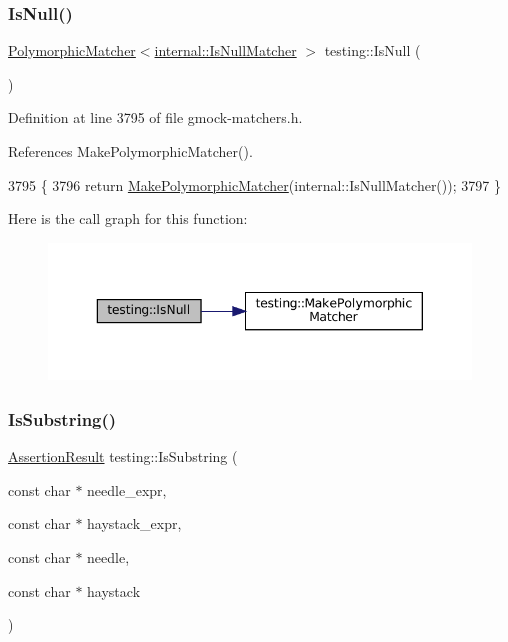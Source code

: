 \subsubsection{\texorpdfstring{Is\+Null()}{IsNull()}}
{\footnotesize\ttfamily \hyperlink{classtesting_1_1PolymorphicMatcher}{Polymorphic\+Matcher}$<$\hyperlink{classtesting_1_1internal_1_1IsNullMatcher}{internal\+::\+Is\+Null\+Matcher} $>$ testing\+::\+Is\+Null (\begin{DoxyParamCaption}{ }\end{DoxyParamCaption})\hspace{0.3cm}{\ttfamily [inline]}}



Definition at line 3795 of file gmock-\/matchers.\+h.



References Make\+Polymorphic\+Matcher().


\begin{DoxyCode}
3795                                                            \{
3796   \textcolor{keywordflow}{return} \hyperlink{namespacetesting_a667ca94f190ec2e17ee2fbfdb7d3da04}{MakePolymorphicMatcher}(internal::IsNullMatcher());
3797 \}
\end{DoxyCode}
Here is the call graph for this function\+:
\nopagebreak
\begin{figure}[H]
\begin{center}
\leavevmode
\includegraphics[width=343pt]{namespacetesting_a56ffb1a169c14ce585fc5bed32add2db_cgraph}
\end{center}
\end{figure}
\mbox{\label{namespacetesting_a390c4f66fe7e9098117eb77e5fffa4ad}} 
\subsubsection{\texorpdfstring{Is\+Substring()}{IsSubstring()}\hspace{0.1cm}{\footnotesize\ttfamily [1/3]}}
{\footnotesize\ttfamily \hyperlink{classtesting_1_1AssertionResult}{Assertion\+Result} testing\+::\+Is\+Substring (\begin{DoxyParamCaption}\item[{const char $\ast$}]{needle\+\_\+expr,  }\item[{const char $\ast$}]{haystack\+\_\+expr,  }\item[{const char $\ast$}]{needle,  }\item[{const char $\ast$}]{haystack }\end{DoxyParamCaption})}



